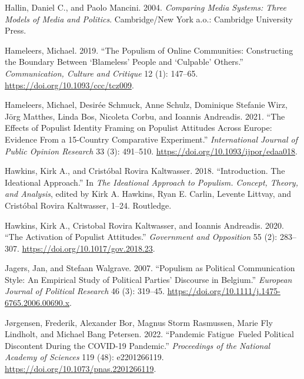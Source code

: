 \documentclass[
]{ccr}
\newlength{\cslhangindent}
\newlength{\cslentryspacingunit} %
\newenvironment{CSLReferences}[2] %
 {%
  \setlength{\parindent}{0pt}
  \ifodd #1
  \let\oldpar\par
  \def\par{\hangindent=\cslhangindent\oldpar}
  \fi
  \setlength{\parskip}{#2\cslentryspacingunit}
 }%
 {}
\begin{document}
\begin{CSLReferences}{1}{0}
\leavevmode{}%
Hallin, Daniel C., and Paolo Mancini. 2004. \emph{Comparing {Media
Systems}: {Three Models} of {Media} and {Politics}}. {Cambridge/New York
a.o.}: {Cambridge University Press}.

\leavevmode{}%
Hameleers, Michael. 2019. {``The Populism of Online Communities:
{Constructing} the Boundary Between {`Blameless'} People and
{`Culpable'} Others.''} \emph{Communication, Culture and Critique} 12
(1): 147--65. \url{https://doi.org/10.1093/ccc/tcz009}.

\leavevmode{}%
Hameleers, Michael, Desirée Schmuck, Anne Schulz, Dominique Stefanie
Wirz, Jörg Matthes, Linda Bos, Nicoleta Corbu, and Ioannis Andreadis.
2021. {``The {Effects} of {Populist Identity Framing} on {Populist
Attitudes Across Europe}: {Evidence From} a 15-{Country Comparative
Experiment}.''} \emph{International Journal of Public Opinion Research}
33 (3): 491--510. \url{https://doi.org/10.1093/ijpor/edaa018}.

\leavevmode{}%
Hawkins, Kirk A., and Cristóbal Rovira Kaltwasser. 2018.
{``Introduction. {The} Ideational Approach.''} In \emph{The {Ideational
Approach} to {Populism}. {Concept}, {Theory}, and {Analysis}}, edited by
Kirk A. Hawkins, Ryan E. Carlin, Levente Littvay, and Cristóbal Rovira
Kaltwasser, 1--24. {Routledge}.

\leavevmode{}%
Hawkins, Kirk A., Cristobal Rovira Kaltwasser, and Ioannis Andreadis.
2020. {``The {Activation} of {Populist Attitudes}.''} \emph{Government
and Opposition} 55 (2): 283--307.
\url{https://doi.org/10.1017/gov.2018.23}.

\leavevmode{}%
Jagers, Jan, and Stefaan Walgrave. 2007. {``Populism as Political
Communication Style: {An} Empirical Study of Political Parties'
Discourse in {Belgium}.''} \emph{European Journal of Political Research}
46 (3): 319--45. \url{https://doi.org/10.1111/j.1475-6765.2006.00690.x}.

\leavevmode{}%
Jørgensen, Frederik, Alexander Bor, Magnus Storm Rasmussen, Marie Fly
Lindholt, and Michael Bang Petersen. 2022. {``Pandemic Fatigue~Fueled
Political Discontent During the {COVID-19} Pandemic.''}
\emph{Proceedings of the National Academy of Sciences} 119 (48):
e2201266119. \url{https://doi.org/10.1073/pnas.2201266119}.


\end{CSLReferences}
\end{document}
